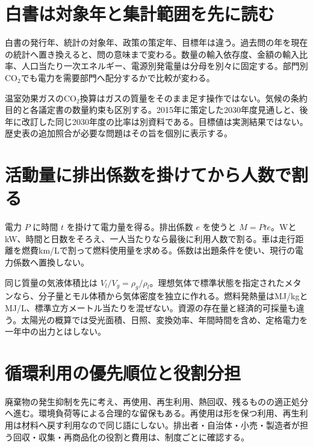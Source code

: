 \section{白書は対象年と集計範囲を先に読む}
\label{theory:env:climate}
\label{theory:env:oil2012}
\label{theory:env:energy2010}
\label{theory:env:energycapita}
\label{theory:env:energymix2015}
白書の発行年、統計の対象年、政策の策定年、目標年は違う。過去問の年を現在の統計へ置き換えると、問の意味まで変わる。数量の輸入依存度、金額の輸入比率、人口当たり一次エネルギー、電源別発電量は分母を別々に固定する。部門別CO\(_2\)でも電力を需要部門へ配分するかで比較が変わる。

温室効果ガスのCO\(_2\)換算はガスの質量をそのまま足す操作ではない。気候の条約目的と各議定書の数量約束も区別する。2015年に策定した2030年度見通しと、後年に改訂した同じ2030年度の比率は別資料である。目標値は実測結果ではない。歴史表の追加照合が必要な問題はその旨を個別に表示する。\cite{env58_ghg2008,env58_oil,env58_mix2015}

\section{活動量に排出係数を掛けてから人数で割る}
\label{theory:env:co2}
\label{theory:env:lng}
\label{theory:env:heating}
\label{theory:env:resource}
電力 \(P\) に時間 \(t\) を掛けて電力量を得る。排出係数 \(e\) を使うと \(M=Pt e\)。WとkW、時間と日数をそろえ、一人当たりなら最後に利用人数で割る。車は走行距離を燃費km/Lで割って燃料使用量を求める。係数は出題条件を使い、現行の電力係数へ置換しない。

同じ質量の気液体積比は \(V_l/V_g=\rho_g/\rho_l\)。理想気体で標準状態を指定されたメタンなら、分子量とモル体積から気体密度を独立に作れる。燃料発熱量はMJ/kgとMJ/L、標準立方メートル当たりを混ぜない。資源の存在量と経済的可採量も違う。太陽光の概算では受光面積、日照、変換効率、年間時間を含め、定格電力を一年中の出力とはしない。\cite{env58_heating}

\section{循環利用の優先順位と役割分担}
\label{theory:env:wasteorder}
\label{theory:env:recyclelaw}
\label{theory:env:wasteterm}
\label{theory:env:balance}
廃棄物の発生抑制を先に考え、再使用、再生利用、熱回収、残るものの適正処分へ進む。環境負荷等による合理的な留保もある。再使用は形を保つ利用、再生利用は材料へ戻す利用なので同じ語にしない。排出者・自治体・小売・製造者が担う回収・収集・再商品化の役割と費用は、制度ごとに確認する。\cite{env_circular_law,env_appliance,env58_wastegoal}


